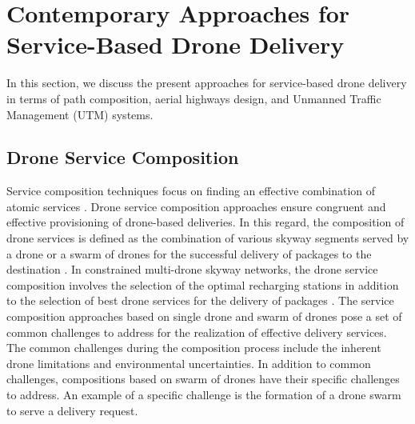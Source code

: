 \documentclass[conference]{IEEEtran}
\begin{document}





\section{Contemporary Approaches for Service-Based Drone Delivery}
In this section, we discuss the present approaches for service-based drone delivery in terms of path composition, aerial highways design, and Unmanned Traffic Management (UTM) systems.

\subsection{Drone Service Composition}
Service composition techniques focus on finding an effective combination of atomic services \cite{ Bouguettaya:2017:SCM:3069398.2983528}. Drone service composition approaches ensure congruent and effective provisioning of drone-based deliveries. In this regard, the composition of drone services is defined as the combination of various skyway segments served by a drone or a swarm of drones for the successful delivery of packages to the destination \cite{shahzaad2019composing,alkouz2020swarm}. In constrained multi-drone skyway networks, the drone service composition involves the selection of the optimal recharging stations in addition to the selection of best drone services for the delivery of packages \cite{shahzaad2019constraint}. The service composition approaches based on single drone and swarm of drones pose a set of common challenges to address for the realization of effective delivery services. The common challenges during the composition process include the inherent drone limitations and environmental uncertainties. In addition to common challenges, compositions based on swarm of drones have their specific challenges to address. An example of a specific challenge is the formation of a drone swarm to serve a delivery request.
\end{document}
